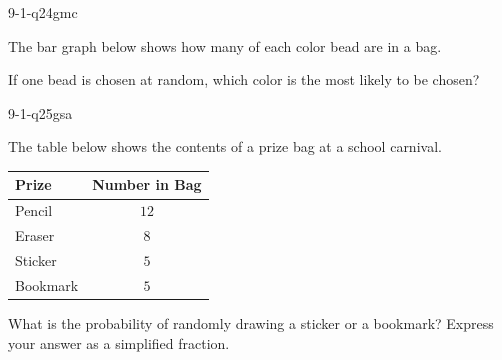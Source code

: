 \begin{practiceQuestion}{9-1-q24}{gmc}
\begin{questionText}
The bar graph below shows how many of each color bead are in a bag.

\begin{center}
\end{center}

If one bead is chosen at random, which color is the most likely to be chosen?
\end{questionText}
\end{practiceQuestion}


\begin{practiceQuestion}{9-1-q25}{gsa}
\begin{questionText}
The table below shows the contents of a prize bag at a school carnival.

\begin{center}
\begin{tabular}{|l|c|}
\hline
\textbf{Prize} & \textbf{Number in Bag} \\
\hline
Pencil & $12$ \\
\hline
Eraser & $8$ \\
\hline
Sticker & $5$ \\
\hline
Bookmark & $5$ \\
\hline
\end{tabular}
\end{center}

What is the probability of randomly drawing a sticker or a bookmark? Express your answer as a simplified fraction.
\end{questionText}
\end{practiceQuestion}

